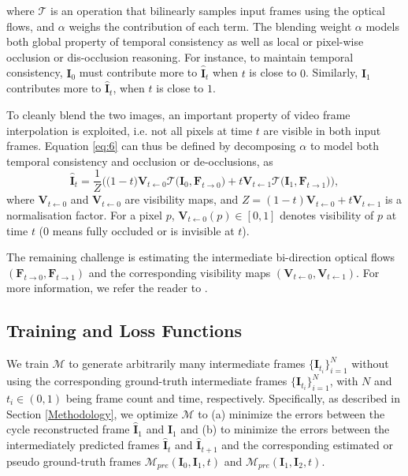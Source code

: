 \documentclass[10pt,twocolumn,letterpaper]{article}
\begin{document}
\noindent where $\mathcal{T}$ is an operation that bilinearly samples input frames using the optical flows, and $\alpha$ weighs the contribution of each term. The blending weight $\alpha$ models both global property of temporal consistency as well as local or pixel-wise occlusion or dis-occlusion reasoning. For instance, to maintain temporal consistency, $\textbf{I}_{0}$ must contribute more to $\hat{\textbf{I}}_{t}$ when $t$ is close to $0$. Similarly, $\textbf{I}_{1}$ contributes more to $\hat{\textbf{I}}_{t}$, when $t$ is close to $1$. 

To cleanly blend the two images, an important property of video frame interpolation is exploited, i.e. not all pixels at time $t$ are visible in both input frames. Equation \ref{eq:6} can thus be defined by decomposing $\alpha$ to model both temporal consistency and occlusion or de-occlusions, as
\begin{equation}  \label{eq:7}
\hat{\textbf{I}}_{t} =\frac{1}{Z}\Big(\big(1-t\big)\textbf{V}_{t\leftarrow0} \mathcal{T}\big(\textbf{I}_{0},\textbf{F}_{t\rightarrow0}\big) + t\textbf{V}_{t\leftarrow1} \mathcal{T}\big(\textbf{I}_{1},\textbf{F}_{t\rightarrow1}\big)\Big) ,
\end{equation}
\noindent where $\textbf{V}_{t\leftarrow0}$ and $\textbf{V}_{t\leftarrow0}$ are visibility maps, and $Z=(1-t)\textbf{V}_{t\leftarrow0}+t\textbf{V}_{t\leftarrow1}$ is a normalisation factor. For a pixel $p$,  $\textbf{V}_{t\leftarrow0}(p) \in [0,1]$ denotes visibility of $p$ at time $t$ ($0$ means fully occluded or is invisible at $t$). 

The remaining challenge is estimating the intermediate bi-direction optical flows $(\textbf{F}_{t\rightarrow0}, \textbf{F}_{t\rightarrow1})$ and the corresponding visibility maps $(\textbf{V}_{t\leftarrow0}, \textbf{V}_{t\leftarrow1})$. For more information, we refer the reader to \cite{jiang2018super}.

\subsection{Training and Loss Functions}
We train $\mathcal{M}$ to generate arbitrarily many intermediate frames $\{{\hat{\textbf{I}}_{t_{i}}}\}_{i=1}^{N}$ without using the corresponding ground-truth intermediate frames $\{{\textbf{I}_{t_{i}}}\}_{i=1}^{N}$, with $N$ and $t_{i}\in(0,1)$ being frame count and time, respectively. Specifically, as described in Section \ref{Methodology}, we optimize $\mathcal{M}$ to (a) minimize the errors between the cycle reconstructed frame $\hat{\textbf{I}}_{1}$ and $\textbf{I}_{1}$ and (b) to minimize the errors between the intermediately predicted frames $\hat{\textbf{I}}_{t}$ and $\hat{\textbf{I}}_{t+1}$ and the corresponding estimated or pseudo ground-truth frames $\mathcal{M}_{pre}(\textbf{I}_{0},\textbf{I}_{1},t)$ and $\mathcal{M}_{pre}(\textbf{I}_{1},\textbf{I}_{2},t)$. 
\end{document}
